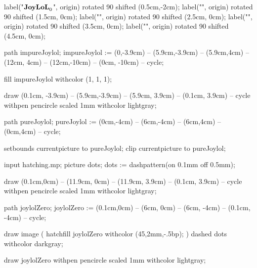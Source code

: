 label("$\bold{JoyLoL}_0$", origin) rotated 90 shifted (0.5cm,-2cm);
label("", origin) rotated 90 shifted (1.5cm, 0cm);
label("", origin) rotated 90 shifted (2.5cm, 0cm);
label("", origin) rotated 90 shifted (3.5cm, 0cm);
label("", origin) rotated 90 shifted (4.5cm, 0cm);


path impureJoylol;
impureJoylol := (0,-3.9cm) -- (5.9cm,-3.9cm) -- (5.9cm,4cm) -- (12cm, 4cm) --
  (12cm,-10cm) -- (0cm, -10cm) -- cycle;

fill impureJoylol withcolor (1, 1, 1);

draw (0.1cm, -3.9cm) -- (5.9cm,-3.9cm) -- (5.9cm, 3.9cm) -- (0.1cm, 3.9cm) -- cycle
  withpen pencircle scaled 1mm
  withcolor lightgray;
  
path pureJoylol;
pureJoylol := (0cm,-4cm) -- (6cm,-4cm) -- (6cm,4cm) -- (0cm,4cm) -- cycle;

setbounds currentpicture to pureJoylol;
clip currentpicture to pureJoylol;

\stopMPcode\egroup

\bgroup\startMPcode
input hatching.mp;
picture dots; dots := dashpattern(on 0.1mm off 0.5mm);


draw (0.1cm,0cm) -- (11.9cm, 0cm) -- (11.9cm, 3.9cm) -- (0.1cm, 3.9cm) -- cycle
  withpen pencircle scaled 1mm
  withcolor lightgray;

path joylolZero;
joylolZero := (0.1cm,0cm) -- (6cm, 0cm) --
  (6cm, -4cm) -- (0.1cm, -4cm) -- cycle;

draw image (
  hatchfill joylolZero
    withcolor (45,2mm,-.5bp);
) dashed dots withcolor darkgray;

draw joylolZero
  withpen pencircle scaled 1mm
  withcolor lightgray;

